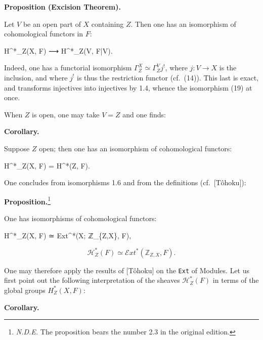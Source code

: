 \documentclass[
  11pt,
  a4paper,
]{book}
\newenvironment{Shaded}{}{}
\newcommand{\NormalTok}[1]{#1}
\begin{document}
\textbf{Proposition (Excision Theorem).}

Let \(V\) be an open part of \(X\) containing \(Z\). Then one has an
isomorphism of cohomological functors in \(F\):

\begin{Shaded}
\begin{Highlighting}[]
\NormalTok{H\^{}*\_Z(X, F) ⟶ H\^{}*\_Z(V, F|V).}
\end{Highlighting}
\end{Shaded}

Indeed, one has a functorial isomorphism
\(\Gamma^{X}_{Z} \simeq \Gamma^{V}_{Z} j^{!}\), where \(j: V \to X\) is
the inclusion, and where \(j^{!}\) is thus the restriction functor
(cf.~(14)). This last is exact, and transforms injectives into
injectives by 1.4, whence the isomorphism (19) at once.

When \(Z\) is open, one may take \(V = Z\) and one finds:

\textbf{Corollary.}

Suppose \(Z\) open; then one has an isomorphism of cohomological
functors:

\begin{Shaded}
\begin{Highlighting}[]
\NormalTok{H\^{}*\_Z(X, F) = H\^{}*(Z, F).}
\end{Highlighting}
\end{Shaded}

One concludes from isomorphisms 1.6 and from the definitions
(cf.~{[}Tôhoku{]}):

\textbf{Proposition.}\footnote{\emph{N.D.E.} The proposition bears the
  number 2.3 in the original edition.}

One has isomorphisms of cohomological functors:

\begin{Shaded}
\begin{Highlighting}[]
\NormalTok{H\^{}*\_Z(X, F) ≃ Ext\^{}*(X; ℤ\_\{Z,X\}, F),}
\end{Highlighting}
\end{Shaded}

\[ \mathcal{H}^{*}_{Z}(F) \simeq \mathcal{E}xt^{*}(\mathbb{Z}_{Z,X}, F). \]

One may therefore apply the results of {[}Tôhoku{]} on the \texttt{Ext}
of Modules. Let us first point out the following interpretation of the
sheaves \(\mathcal{H}^{*}_{Z}(F)\) in terms of the global groups
\(H^{*}_{Z}(X, F)\):

\textbf{Corollary.}
\end{document}
